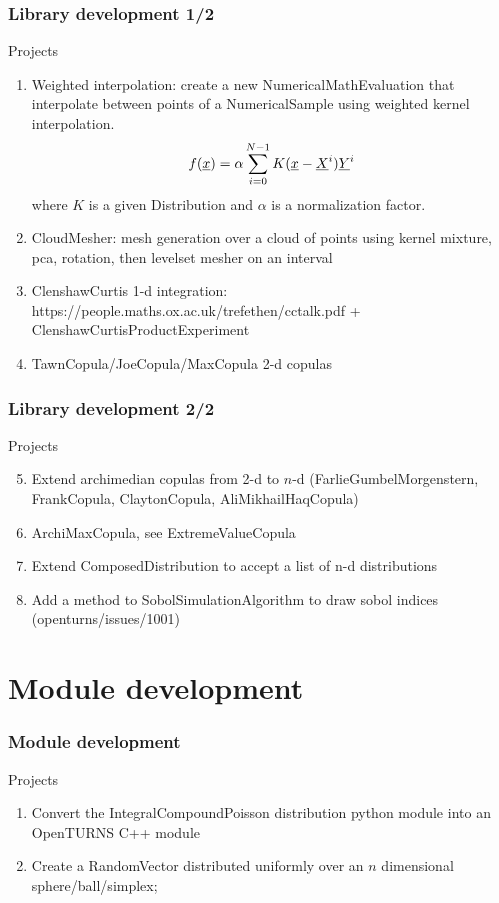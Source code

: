 \documentclass[8pt]{beamer}
\begin{document}
\begin{frame}
  \frametitle{Library development 1/2}
  \begin{block}{Projects}
    \begin{enumerate}
      \item Weighted interpolation: create a new NumericalMathEvaluation that interpolate between points of a NumericalSample using weighted kernel interpolation.
        \begin{equation}
          f({\underline{x}})=\alpha\sum_{i=0}^{N-1}K({\underline{x}}-{\underline{X}}^i){\underline{Y}}^i
        \end{equation}
where $K$ is a given Distribution and $\alpha$ is a normalization factor.
      \item CloudMesher: mesh generation over a cloud of points using kernel mixture, pca, rotation, then levelset mesher on an interval
      \item ClenshawCurtis 1-d integration: https://people.maths.ox.ac.uk/trefethen/cctalk.pdf + ClenshawCurtisProductExperiment
      \item TawnCopula/JoeCopula/MaxCopula 2-d copulas
    \end{enumerate}
  \end{block}
\end{frame}

\begin{frame}
  \frametitle{Library development 2/2}
  \begin{block}{Projects}
    \begin{enumerate}
      \setcounter{enumi}{4}
      \item Extend archimedian copulas from 2-d to $n$-d (FarlieGumbelMorgenstern, FrankCopula, ClaytonCopula, AliMikhailHaqCopula)
      \item ArchiMaxCopula, see ExtremeValueCopula
      \item Extend ComposedDistribution to accept a list of n-d distributions
      \item Add a method to SobolSimulationAlgorithm to draw sobol indices (openturns/issues/1001)
    \end{enumerate}
  \end{block}
\end{frame}



\section{Module development}

\begin{frame}
  \frametitle{Module development}
  \begin{block}{Projects}
    \begin{enumerate}
      \item Convert the IntegralCompoundPoisson distribution python module into an OpenTURNS C++ module
      \item Create a RandomVector distributed uniformly over an $n$ dimensional sphere/ball/simplex;
    \end{enumerate}
  \end{block}
\end{frame}
\end{document}
